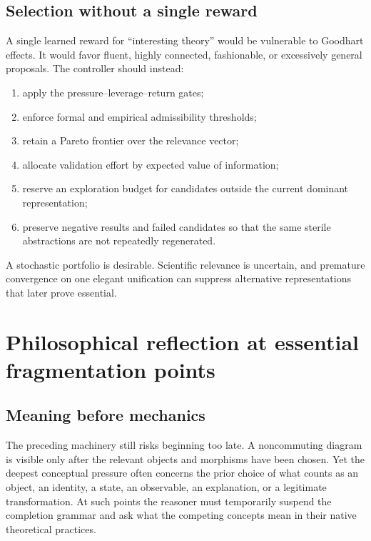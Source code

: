 \documentclass[11pt]{article}
\begin{document}
\subsection{Selection without a single reward}

A single learned reward for ``interesting theory'' would be vulnerable to Goodhart effects. It would
favor fluent, highly connected, fashionable, or excessively general proposals. The controller should
instead:
\begin{enumerate}
  \item apply the pressure--leverage--return gates;
  \item enforce formal and empirical admissibility thresholds;
  \item retain a Pareto frontier over the relevance vector;
  \item allocate validation effort by expected value of information;
  \item reserve an exploration budget for candidates outside the current dominant representation;
  \item preserve negative results and failed candidates so that the same sterile abstractions are not
  repeatedly regenerated.
\end{enumerate}

A stochastic portfolio is desirable. Scientific relevance is uncertain, and premature convergence on
one elegant unification can suppress alternative representations that later prove essential.

\section{Philosophical reflection at essential fragmentation points}

\subsection{Meaning before mechanics}

The preceding machinery still risks beginning too late. A noncommuting diagram is visible only after
the relevant objects and morphisms have been chosen. Yet the deepest conceptual pressure often concerns
the prior choice of what counts as an object, an identity, a state, an observable, an explanation, or a
legitimate transformation. At such points the reasoner must temporarily suspend the completion grammar
and ask what the competing concepts mean in their native theoretical practices.
\end{document}
